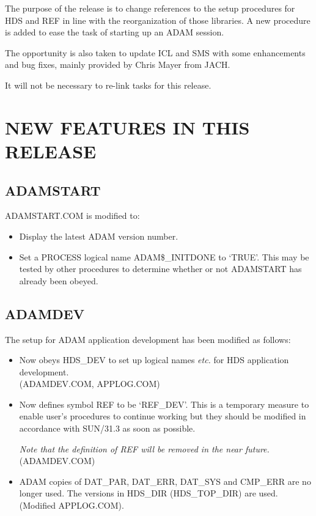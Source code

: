 The purpose of the release is to change references to the setup procedures
for HDS and REF in line with the reorganization of those libraries. 
A new procedure is added to ease the task of starting up an ADAM session.

The opportunity is also taken to update ICL and SMS with some enhancements
and bug fixes, mainly provided by Chris Mayer from JACH.

It will not be necessary to re-link tasks for this release.

\section{NEW FEATURES IN THIS RELEASE}

\subsection{ADAMSTART}
ADAMSTART.COM is modified to:
\begin{itemize}
\item Display the latest ADAM version number.
\item Set a PROCESS logical name ADAM\$\_INITDONE to `TRUE'. This may be
tested by other procedures to determine whether or not ADAMSTART has
already been obeyed.
\end{itemize}

\subsection{ADAMDEV}
The setup for ADAM application development has been modified as follows:
\begin{itemize}
\item Now obeys HDS\_DEV to set up logical names {\em etc.} for HDS 
application development.\\
(ADAMDEV.COM, APPLOG.COM)
\item Now defines symbol REF to be `REF\_DEV'.
This is a temporary measure to enable user's procedures to continue
working but they should be modified in accordance with SUN/31.3 as soon as
possible.

{\em Note that the definition of REF will be removed in the near future.}\\
(ADAMDEV.COM)
\item ADAM copies of DAT\_PAR, DAT\_ERR, DAT\_SYS and CMP\_ERR are
no longer used. The versions in HDS\_DIR (HDS\_TOP\_DIR) are used.\\
(Modified APPLOG.COM).
\end{itemize}

